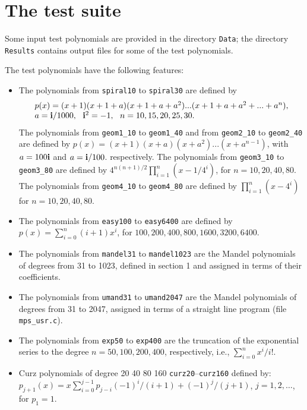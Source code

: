 \documentclass{article}
\begin{document}
\section{The test suite}

Some input test polynomials are provided in the directory {\tt Data};
the directory {\tt Results} contains output files for some of the test
polynomials.

The test polynomials have the following features:
\begin{itemize}
\item The polynomials from {\tt spiral10} to {\tt spiral30} are defined by
\[\begin{array}{l}
p(x) = (x+1) (x+1+a) (x+1+a+a^2) ... (x+1+a+a^2+... +a^n), \\
 a = {\bf i}/1000, ~~   {\bf i}^2 = -1,~~   n = 10, 15, 20, 25, 30.
\end{array}
\] 
The polynomials from  {\tt geom1\_10} to {\tt geom1\_40} and from
 {\tt geom2\_10} to {\tt geom2\_40} are defined by
$p(x) = (x+1) (x+a) (x+a^2) ... (x+a^{n-1})$, 
with $a=100{\bf i}$ and $a={\bf i}/100$. respectively.
The polynomials from  {\tt geom3\_10} to {\tt geom3\_80} are defined by
$4^{n(n+1)/2}\prod_{i=1}^n(x-1/4^i)$, for $n=10,20,40,80$.
The polynomials from  {\tt geom4\_10} to {\tt geom4\_80} are defined by
$\prod_{i=1}^n(x-4^i)$ for $n=10,20,40,80$.

\item The polynomials from {\tt easy100} to {\tt easy6400} are defined by
$p(x)=\sum_{i=0}^n (i+1)x^i$, for $100, 200, 400, 800, 1600, 3200, 6400$. 

\item
The polynomials from {\tt mandel31} to {\tt mandel1023} are the Mandel
polynomials of degrees from 31 to 1023, defined in section 1 and
assigned in terms of their coefficients.
\item
The polynomials from {\tt umand31} to {\tt umand2047} are the Mandel
polynomials of degrees from 31 to 2047, assigned in terms of a
straight line program (file {\tt mps\_usr.c}).
\item
The polynomials from {\tt exp50} to  {\tt exp400} are the 
truncation of the
exponential series to the degree $n=50,100,200,400$, respectively, i.e.,
$\sum_{i=0}^n x^i/i!$.

\item Curz polynomials of degree 20 40 80 160 {\tt curz20}--{\tt curz160}
defined by:
$p_{j+1}(x)=x\sum_{i=0}^{j-1}p_{j-i}(-1)^i/(i+1) +(-1)^j/(j+1)$,
$j=1,2,\ldots$,
for $p_1=1$.


\end{itemize}
\end{document}
